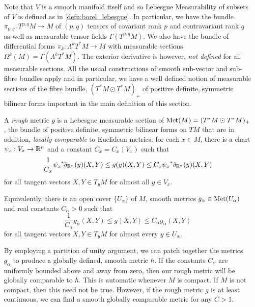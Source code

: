 \documentclass[a4paper, 12pt]{amsart}
\begin{document}
Note that \(V\) is a smooth manifold itself and so Lebesgue Measurability of subsets of \(V\) is defined as in \ref{defn:borel_lebesgue}. In particular, we have the bundle $\pi_{p,q} : T^{p,q}M \to M$ of $(p,q)$ tensors of covariant rank $p$ and contravariant rank $q$ as well as measurable tensor fields \(\Gamma(T^{p,q}M)\). We also have the bundle of differential forms \(\pi_k : \Lambda^k T^{\ast} M \to M\) with measurable sections \(\Omega^k(M) = \Gamma(\Lambda^k T^{\ast} M)\). The exterior derivative is however, \emph{not defined} for all measurable sections. All the usual constructions of smooth sub-vector and sub-fibre bundles apply and in particular, we have a well defined notion of measurable sections of the fibre bundle, \((T^{\ast} M \odot T^{\ast} M)_+\) of positive definite, symmetric bilinear forms important in the main definition of this section.

\begin{defn}
\label{defn:rough_metric}
A \emph{rough} metric \(g\) is a Lebesgue measurable section of \(\operatorname{Met}(M) = (T^{\ast} M \odot T^{\ast} M)_+\), the bundle of positive definite, symmetric bilinear forms on \(TM\) that are in addition, \emph{locally comparable} to Euclidean metrics:
for each $x \in M$, there is a chart $\psi_x:V_x \to \mathbb{R}^n$ and a constant $C_x = C_x(V_x)$ such that
\[
\frac{1}{C_{x}} {\psi_x}^\ast\delta_{\mathbb{R}^n}(y) (X, Y) \leq g(y)(X, Y) \leq C_{x} {\psi_x}^\ast\delta_{\mathbb{R}^n}(y) (X, Y)
\]
for all tangent vectors \(X, Y \in T_yM\) for almost all $y \in V_x$. 
\end{defn}

\begin{rem}
Equivalently, there is an open cover \(\lbrace U_{\alpha} \rbrace\) of \(M\), smooth metrics \(g_{\alpha} \in \operatorname{Met}(U_{\alpha})\) and real constants \(C_{\alpha} > 0\) such that
\[
\frac{1}{C_{\alpha}} g_{\alpha} (X, Y) \leq g(X, Y) \leq C_{\alpha} g_{\alpha} (X, Y)
\]
for all tangent vectors \(X, Y \in T_yM\) for almost every $y \in U_\alpha$.
\end{rem}

\begin{rem}
By employing a partition of unity argument, we can patch together the metrics \(g_{\alpha}\) to produce a globally defined, smooth metric \(h\). If the constants \(C_{\alpha}\) are uniformly bounded above and away from zero, then our rough metric will be globally comparable to \(h\). This is automatic whenever \(M\) is compact. If \(M\) is not compact, then this need not be true.
However, if the rough metric $g$ is at least continuous, we can find a smooth globally comparable metric for any $C > 1$. 
\end{rem}
\end{document}
